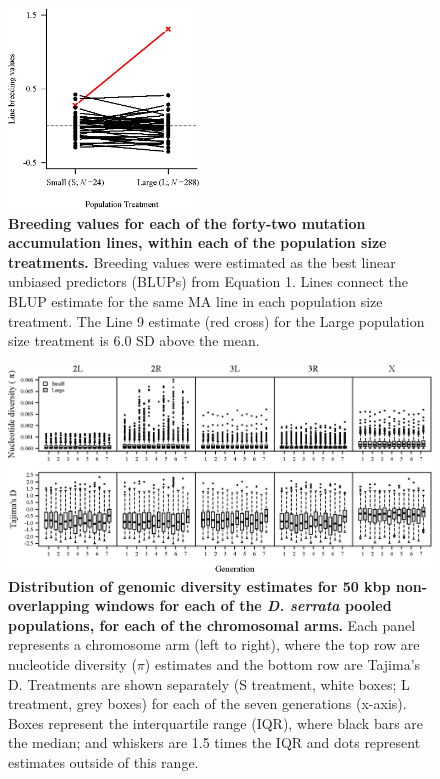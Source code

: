 \begin{figure}[!h]
    \hspace{4.25cm}
    \includegraphics[width=0.45\textwidth]{Chp4_DNA/2023_Fit_blups.eps}
\caption[Breeding values for each of the forty-two mutation accumulation lines, within each of the population size treatments.]{\textbf{Breeding values for each of the forty-two mutation accumulation lines, within each of the population size treatments.} Breeding values were estimated as the best linear unbiased predictors (BLUPs) from Equation 1. Lines connect the BLUP estimate for the same MA line in each population size treatment. The Line 9 estimate (red cross) for the Large population size treatment is 6.0 SD above the mean.}
    \label{fig:FitBlups}
\end{figure}

\FloatBarrier

\begin{landscape}
\begin{figure}[!h]
    \centering
    \includegraphics[width=1.2\textwidth]{Chp4_DNA/NucVsTajD.eps}
\caption[Distribution of genomic diversity estimates for 50 kbp non-overlapping windows for each of the \textit{D. serrata} pooled populations, for each of the chromosomal arms.]{\textbf{Distribution of genomic diversity estimates for 50 kbp non-overlapping windows for each of the \textit{D. serrata} pooled populations, for each of the chromosomal arms.} Each panel represents a chromosome arm (left to right), where the top row are nucleotide diversity ($\pi$) estimates and the bottom row are Tajima’s D. Treatments are shown separately (S treatment, white boxes; L treatment, grey boxes) for each of the seven generations (x-axis). Boxes represent the interquartile range (IQR), where black bars are the median; and whiskers are 1.5 times the IQR and dots represent estimates outside of this range. }
    \label{fig:FitNucDiv}
\end{figure}
\end{landscape}

